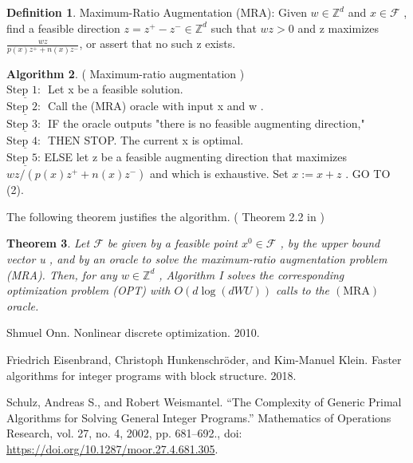 \documentclass{article}
\theoremstyle{plain}
\newtheorem{theorem}{Theorem}[section]
\theoremstyle{definition}
\newtheorem{definition}[theorem]{Definition}
\newtheorem{algorithm}[theorem]{Algorithm}
\begin{document}
\begin{definition}
Maximum-Ratio Augmentation (MRA): Given  $w \in \mathbb{Z}^{d}$  and  $x \in \mathscr{F}$ , find a feasible direction  $z=z^{+}-z^{-} \in \mathbb{Z}^{d}$  such that  $w z>0$  and  z  maximizes $\frac{w z}{p(x) z^{+}+n(x) z^{-}}$, or assert that no such  z  exists.
\end{definition}

\begin{algorithm} ( Maximum-ratio augmentation ) \\
\noindent $ \underline{\text {Step 1: }}$ Let  x  be a feasible solution. \\
\noindent $ \underline{\text {Step 2: }}$ Call the (MRA) oracle with input  x  and  w . \\
\noindent $ \underline{\text {Step 3: }}$ IF the oracle outputs "there is no feasible augmenting direction," \\
\noindent $ \underline{\text {Step 4: }}$ THEN STOP. The current  x  is optimal. \\
\noindent $ \underline{\text {Step 5: }}$ELSE let  z  be a feasible augmenting direction that maximizes  $w z /\left(p(x) z^{+}+n(x) z^{-}\right)$ and which is exhaustive. Set  $x:=x+z$ . GO TO (2). \\
\end{algorithm}

The following theorem justifies the algorithm. ( Theorem 2.2 in \cite{ref3} )

\begin{theorem}
Let  $\mathscr{F}$  be given by a feasible point  $x^{0} \in \mathscr{F}$ , by the upper bound vector  u , and by an oracle to solve the maximum-ratio augmentation problem (MRA). Then, for any  $w \in \mathbb{Z}^{d}$ , Algorithm I solves the corresponding optimization problem (OPT) with  $O(d \log (d W U))$  calls to the  $(\mathrm{MRA})$  oracle.
\end{theorem}





\newpage

\newcommand{\doi}[1]{doi: \href{https://doi.org/#1}{#1}}
\begin{thebibliography}{99}  

 Shmuel Onn. Nonlinear discrete optimization. 2010.

 Friedrich Eisenbrand, Christoph Hunkenschröder, and Kim-Manuel Klein. Faster algorithms for integer programs with block structure. 2018.

Schulz, Andreas S., and Robert Weismantel. “The Complexity of Generic Primal Algorithms for Solving General Integer Programs.” Mathematics of Operations Research, vol. 27, no. 4, 2002, pp. 681–692., \doi{https://doi.org/10.1287/moor.27.4.681.305}. 
\end{thebibliography}
\end{document}
